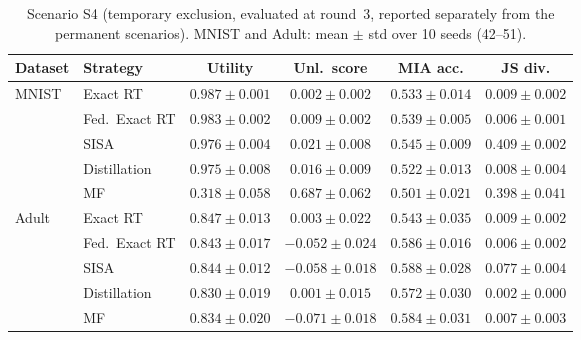 \begin{table}[H]
\centering
\caption{Scenario S4 (temporary exclusion, evaluated at round~3, reported separately from the permanent scenarios). MNIST and Adult: mean $\pm$ std over 10 seeds (42--51).}
\label{tab:s4}
\small
\renewcommand{\arraystretch}{1.2}
\begin{tabular}{@{} l l c c c c @{}}
\toprule
\textbf{Dataset} & \textbf{Strategy} & \textbf{Utility} & \textbf{Unl.\ score} & \textbf{MIA acc.} & \textbf{JS div.} \\
\midrule
\multirow{5}{*}{MNIST} & Exact RT & $0.987 \pm 0.001$ & $0.002 \pm 0.002$ & $0.533 \pm 0.014$ & $0.009 \pm 0.002$ \\
 & Fed.\ Exact RT & $0.983 \pm 0.002$ & $0.009 \pm 0.002$ & $0.539 \pm 0.005$ & $0.006 \pm 0.001$ \\
 & SISA & $0.976 \pm 0.004$ & $0.021 \pm 0.008$ & $0.545 \pm 0.009$ & $0.409 \pm 0.002$ \\
 & Distillation & $0.975 \pm 0.008$ & $0.016 \pm 0.009$ & $0.522 \pm 0.013$ & $0.008 \pm 0.004$ \\
 & MF & $0.318 \pm 0.058$ & $0.687 \pm 0.062$ & $0.501 \pm 0.021$ & $0.398 \pm 0.041$ \\
\midrule
\multirow{5}{*}{Adult} & Exact RT & $0.847 \pm 0.013$ & $0.003 \pm 0.022$ & $0.543 \pm 0.035$ & $0.009 \pm 0.002$ \\
 & Fed.\ Exact RT & $0.843 \pm 0.017$ & $-0.052 \pm 0.024$ & $0.586 \pm 0.016$ & $0.006 \pm 0.002$ \\
 & SISA & $0.844 \pm 0.012$ & $-0.058 \pm 0.018$ & $0.588 \pm 0.028$ & $0.077 \pm 0.004$ \\
 & Distillation & $0.830 \pm 0.019$ & $0.001 \pm 0.015$ & $0.572 \pm 0.030$ & $0.002 \pm 0.000$ \\
 & MF & $0.834 \pm 0.020$ & $-0.071 \pm 0.018$ & $0.584 \pm 0.031$ & $0.007 \pm 0.003$ \\
\midrule
\bottomrule
\end{tabular}
\end{table}
